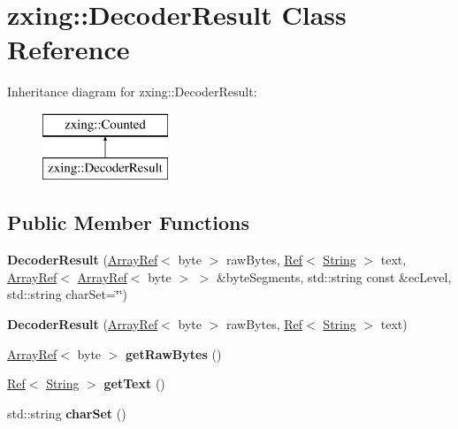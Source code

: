 \hypertarget{classzxing_1_1_decoder_result}{}\section{zxing\+:\+:Decoder\+Result Class Reference}
\label{classzxing_1_1_decoder_result}
Inheritance diagram for zxing\+:\+:Decoder\+Result\+:\begin{figure}[H]
\begin{center}
\leavevmode
\includegraphics[height=2.000000cm]{classzxing_1_1_decoder_result}
\end{center}
\end{figure}
\subsection*{Public Member Functions}
\begin{DoxyCompactItemize}
\item 
\mbox{\label{classzxing_1_1_decoder_result_ae4de183ebb2d8ab0896fdc136eabee88}} 
{\bfseries Decoder\+Result} (\mbox{\hyperlink{classzxing_1_1_array_ref}{Array\+Ref}}$<$ byte $>$ raw\+Bytes, \mbox{\hyperlink{classzxing_1_1_ref}{Ref}}$<$ \mbox{\hyperlink{classzxing_1_1_string}{String}} $>$ text, \mbox{\hyperlink{classzxing_1_1_array_ref}{Array\+Ref}}$<$ \mbox{\hyperlink{classzxing_1_1_array_ref}{Array\+Ref}}$<$ byte $>$ $>$ \&byte\+Segments, std\+::string const \&ec\+Level, std\+::string char\+Set=\char`\"{}\char`\"{})
\item 
\mbox{\label{classzxing_1_1_decoder_result_a44ea27e80debbe20993642930550b0ff}} 
{\bfseries Decoder\+Result} (\mbox{\hyperlink{classzxing_1_1_array_ref}{Array\+Ref}}$<$ byte $>$ raw\+Bytes, \mbox{\hyperlink{classzxing_1_1_ref}{Ref}}$<$ \mbox{\hyperlink{classzxing_1_1_string}{String}} $>$ text)
\item 
\mbox{\label{classzxing_1_1_decoder_result_ad97b6843b20a5a86bdb2d8dca1ffc695}} 
\mbox{\hyperlink{classzxing_1_1_array_ref}{Array\+Ref}}$<$ byte $>$ {\bfseries get\+Raw\+Bytes} ()
\item 
\mbox{\label{classzxing_1_1_decoder_result_a4f75598fbf064b09ba92736ec92398d6}} 
\mbox{\hyperlink{classzxing_1_1_ref}{Ref}}$<$ \mbox{\hyperlink{classzxing_1_1_string}{String}} $>$ {\bfseries get\+Text} ()
\item 
\mbox{\label{classzxing_1_1_decoder_result_a141cddce8f17ecbcc01e057a3043967c}} 
std\+::string {\bfseries char\+Set} ()
\end{DoxyCompactItemize}


